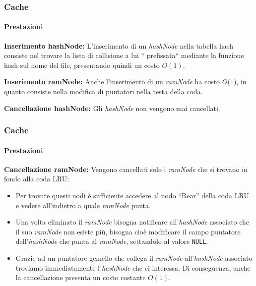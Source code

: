 \documentclass{beamer}
\begin{document}
\begin{frame}
\frametitle{Cache}
\framesubtitle{Prestazioni}

\textbf{Inserimento hashNode:}
L'inserimento di un \textit{hashNode} nella tabella hash consiste nel trovare la lista
di collisione a lui `` prefissata``  mediante la funzione hash sul nome del file,
presentando quindi un costo $O(1)$.

\medskip

\textbf{Inserimento ramNode:}
Anche l’inserimento di un \textit{ramNode} ha costo $O(1$), in quanto consiste
nella modifica di puntatori nella testa della coda.

\medskip

\textbf{Cancellazione hashNode:} Gli \textit{hashNode} non vengono mai cancellati.
\end{frame}
\begin{frame}
\frametitle{Cache}
\framesubtitle{Prestazioni}

\textbf{Cancellazione ramNode:} Vengono cancellati solo i \textit{ramNode}
che si trovano in fondo alla coda LRU:

\begin{itemize}


\item Per trovare questi nodi è sufficiente
accedere al nodo ``Rear''  della coda LRU e vedere all'indietro a quale
\textit{ramNode} punta.

\medskip

\item Una volta eliminato il \textit{ramNode} bisogna notificare all'\textit{hashNode} associato
che il suo \textit{ramNode} non esiste più, bisogna cioè modificare il campo
puntatore dell'\textit{hashNode} che punta al \textit{ramNode}, settandolo al valore
\texttt{NULL}.

\medskip

\item Grazie ad un puntatore
gemello che collega il \textit{ramNode} all'\textit{hashNode} associato troviamo immediatamente l'\textit{hashNode} che ci
interessa. Di conseguenza, anche la cancellazione presenta un costo
costante $O(1)$.


\end{itemize}

\end{frame}
\end{document}
